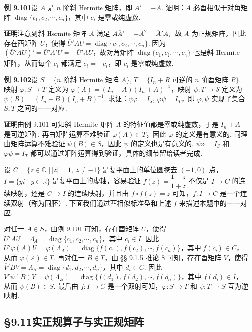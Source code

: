 \documentclass[UTF8, 12pt, fontset=fandol, oneside]{ctexart}
\begin{document}
\noindent\textbf{例 9.101}\quad 设 $A$ 是 $n$ 阶斜 Hermite 矩阵，即 $\overline{A}'=-A$. 证明：$A$ 必酉相似于对角矩阵 $\operatorname{diag}\{c_1,c_2,\cdots,c_n\}$，其中 $c_i$ 是零或纯虚数.

\noindent\textbf{证明}\quad 注意到斜 Hermite 矩阵 $A$ 满足 $A\overline{A}'=-A^2=\overline{A}'A$，故 $A$ 为正规矩阵，因此存在酉矩阵 $U$，使得 $\overline{U}'AU=\operatorname{diag}\{c_1,c_2,\cdots,c_n\}$. 因为 $(\overline{U}'AU)'=\overline{U}'A'U=-\overline{U}'AU$，故对角矩阵 $\operatorname{diag}\{c_1,c_2,\cdots,c_n\}$ 也是斜 Hermite 矩阵，从而每个 $c_i$ 都满足 $\overline{c_i}=-c_i$，即 $c_i$ 是零或纯虚数.

\noindent\textbf{例 9.102}\quad 设 $S=\{n\text{ 阶斜 Hermite 矩阵 }A\}$, $T=\{I_n+B\text{ 可逆的 }n\text{ 阶酉矩阵 }B\}$. 映射 $\varphi:S\to T$ 定义为 $\varphi(A)=(I_n-A)(I_n+A)^{-1}$，映射 $\psi:T\to S$ 定义为 $\psi(B)=(I_n-B)(I_n+B)^{-1}$. 求证：$\psi\varphi=I_S$, $\varphi\psi=I_T$，即 $\varphi,\psi$ 实现了集合 $S,T$ 之间的一一对应.

\noindent\textbf{证明}\quad 由例 9.101 可知斜 Hermite 矩阵 $A$ 的特征值都是零或纯虚数，于是 $I_n+A$ 是可逆矩阵. 再由矩阵运算不难验证 $\varphi(A)\in T$，因此 $\varphi$ 的定义是有意义的. 同理由矩阵运算不难验证 $\psi(B)\in S$，因此 $\psi$ 的定义也是有意义的. $\psi\varphi=I_S$ 和 $\varphi\psi=I_T$ 都可以通过矩阵运算得到验证，具体的细节留给读者完成.

设 $C=\{z\in\mathbb{C}\mid |z|=1,\ z\ne-1\}$ 是复平面上的单位圆挖去 $(-1,0)$ 点，$I=\{yi\mid y\in\mathbb{R}\}$ 是复平面上的虚轴，容易验证 $f(z)=\dfrac{1-z}{1+z}$ 不仅是 $I\to C$ 的连续映射，还是 $C\to I$ 的连续映射，并且由 $f\circ f(z)=z$ 可知，$f:I\to C$ 是一个连续双射（称为同胚）. 下面我们通过酉相似标准型和上述 $f$ 来描述本题中的一一对应.

对任一 $A\in S$，由例 9.101 可知，存在酉矩阵 $U$，使得 $\overline{U}'AU=\Lambda_A=\operatorname{diag}\{c_1,c_2,\cdots,c_n\}$，其中 $c_i\in I$. 因此 $\overline{U}'\varphi(A)U=\varphi(\Lambda_A)=\operatorname{diag}\{f(c_1),f(c_2),\cdots,f(c_n)\}$，其中 $f(c_i)\in C$，从而 $\varphi(A)\in T$. 再对任一 $B\in T$，由 §§ 9.1.5 推论 8 可知，存在酉矩阵 $V$，使得 $\overline{V}'BV=\Lambda_B=\operatorname{diag}\{d_1,d_2,\cdots,d_n\}$，其中 $d_i\in C$. 因此 $\overline{V}'\psi(B)V=\psi(\Lambda_B)=\operatorname{diag}\{f(d_1),f(d_2),\cdots,f(d_n)\}$，其中 $f(d_i)\in I$，从而 $\psi(B)\in S$. 最后由 $f:I\to C$ 是一个双射可知，$\varphi:S\to T$ 和 $\psi:T\to S$ 互为逆映射.

\subsection*{§9.11\quad 实正规算子与实正规矩阵}
\end{document}
